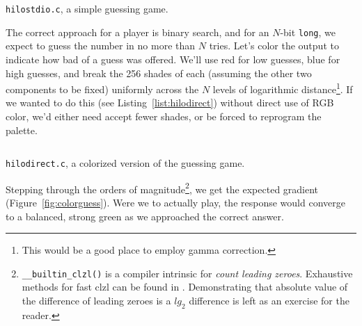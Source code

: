 \documentclass[letterpaper,10pt]{article}
\begin{document}
\begin{listing}[!htb]
\inputminted[]{C}{code/hilostdio.c}
\caption{\texttt{hilostdio.c}, a simple guessing game.}
\label{list:guessgame}
\end{listing}

The correct approach for a player is binary search, and for an $N$-bit
\texttt{long}, we expect to guess the number in no more than $N$ tries. Let's
color the output to indicate how bad of a guess was offered. We'll use red for
low guesses, blue for high guesses, and break the 256 shades of each (assuming
the other two components to be fixed) uniformly across the $N$ levels of
logarithmic distance\footnote{This would be a good place to employ \gls{gamma correction}.}.
If we wanted to do this (see Listing~\ref{list:hilodirect}) without direct use of RGB color,
we'd either need accept fewer shades, or be forced to reprogram the palette.

\begin{listing}[!htb]
\inputminted[]{C}{code/hilodirect.c}
\caption{\texttt{hilodirect.c}, a colorized version of the guessing game.}
\label{list:hilodirect}
\end{listing}

Stepping through the orders of magnitude\footnote{\texttt{\_\_builtin\_clzl()}
is a compiler intrinsic for \textit{count leading zeroes}. Exhaustive methods
for fast clzl can be found in \cite{hackerdelight}. Demonstrating that
absolute value of the difference of leading zeroes is a $lg_{2}$ difference
is left as an exercise for the reader.}, we get the expected gradient
(Figure~\ref{fig:colorguess}). Were we to actually play, the response would
converge to a balanced, strong green as we approached the correct answer.
\end{document}
